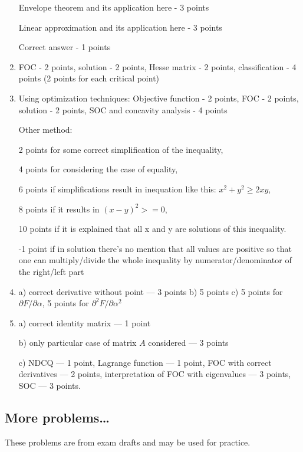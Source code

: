 \begin{enumerate}
  Envelope theorem and its application here - 3 points 
  
  Linear approximation and its application here - 3 points
  
  Correct answer - 1 points

  \item FOC - 2 points, solution - 2 points, Hesse matrix - 2 points, classification - 4 points (2 points for each critical point)

  \item
  Using optimization techniques:
  Objective function - 2 points, FOC - 2 points, solution - 2 points, SOC and concavity analysis - 4 points
  
  Other method:
  
  2 points for some correct simplification of the inequality, 
  
  4 points for considering the case of equality, 
  
  6 points if simplifications result in inequation like this: $x^2+y^2 \geq 2xy$, 
  
  8 points if it results in $(x-y)^2>=0$, 
  
  10 points if it is explained that all x and y are solutions of this inequality.
  
  -1 point if in solution there’s no mention that all values are positive so that one can multiply/divide the whole inequality by numerator/denominator of the right/left part

  \item a) correct derivative without point — 3 points
  b) 5 points
  c) 5 points for $\partial F/\partial \alpha$, 5 points for $\partial^2 F/\partial \alpha^2$

  \item a) correct identity matrix — 1 point

  b) only particular case of matrix $A$ considered — 3 points

  c) NDCQ — 1 point, Lagrange function — 1 point, FOC with correct derivatives — 2 points,
  interpretation of FOC with eigenvalues — 3 points, SOC — 3 points.

\end{enumerate}



\subsection{More problems\ldots}

These problems are from exam drafts and may be used for practice. 

